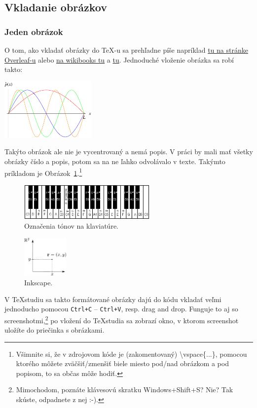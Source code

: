 \subsection{Vkladanie obrázkov}\label{sec:vkladanie_obrazkov}

\subsubsection{Jeden obrázok}
O tom, ako vkladať obrázky do TeX-u sa prehľadne píše napríklad \href{https://www.overleaf.com/learn/latex/Inserting_Images}{tu na stránke Overleaf-u} alebo \href{https://en.wikibooks.org/wiki/LaTeX/Importing_Graphics}{na wikibooks tu} a \href{https://en.wikibooks.org/wiki/LaTeX/Floats,_Figures_and_Captions}{tu}. Jednoduché vloženie obrázka sa robí takto:

\includegraphics[width=0.35\textwidth]{stoj2}

Takýto obrázok ale nie je vycentrovaný a nemá popis. V práci by mali mať všetky obrázky číslo a popis, potom sa na ne ľahko odvolávalo v texte. Takýmto príkladom je Obrázok~\ref{fig:klavir}.\footnote{Všimnite si, že v zdrojovom kóde je (zakomentovaný) \textbackslash vspace\{...\}, pomocou ktorého môžete zväčšiť/zmenšiť biele miesto pod/nad obrázkom a pod popisom, to sa občas môže hodiť.}

\begin{figure}[h]
	\centering
	\includegraphics[width=0.6\textwidth]{klavir2}
	\caption{Označenia tónov na klaviatúre.}
	\label{fig:klavir}
\end{figure}

\begin{figure}
	\centering
	\includegraphics[width=0.2\textwidth]{bod_v_rovine}
	\caption{Inkscape.}
	\label{fig:bod_v_rovine}
\end{figure}
V TeXstudiu sa takto formátované obrázky dajú do kódu vkladať veľmi jednoducho pomocou \verb|Ctrl+C| -- \verb|Ctrl+V|, resp. drag and drop. Funguje to aj so screenshotmi,\footnote{Mimochodom, poznáte klávesovú skratku Windows+Shift+S? Nie? Tak skúste, odpadnete z nej :-).} po vložení do TeXstudia sa zobrazí okno, v ktorom screenshot uložíte do priečinka s obrázkami.

